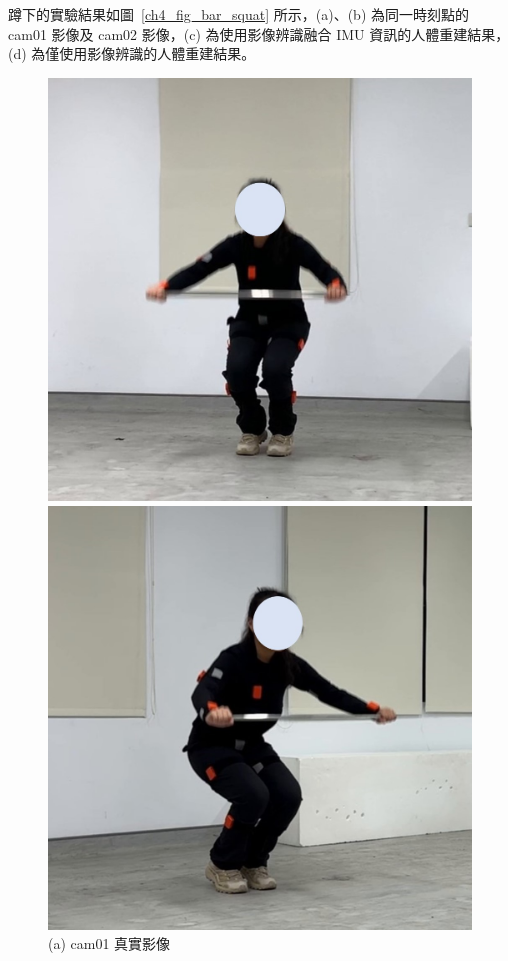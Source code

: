 \clearpage

蹲下的實驗結果如圖~\ref{ch4_fig_bar_squat} 所示，(a)、(b) 為同一時刻點的 cam01 影像及 cam02 影像，(c) 為使用影像辨識融合 IMU 資訊的人體重建結果，(d) 為僅使用影像辨識的人體重建結果。

\begin{figure}[!ht]
   \centering
   \begin{minipage}{.5\textwidth}
      \centering
      \includegraphics[width=.95\linewidth]{figure/ch4_fig_bar_cam01_with2.jpg}
      \caption*{(a) cam01 真實影像}
    \end{minipage}%
    \begin{minipage}{.5\textwidth}
       \centering
       \includegraphics[width=.95\linewidth]{figure/ch4_fig_bar_cam02_with2.jpg}

\end{minipage}
\end{figure}
